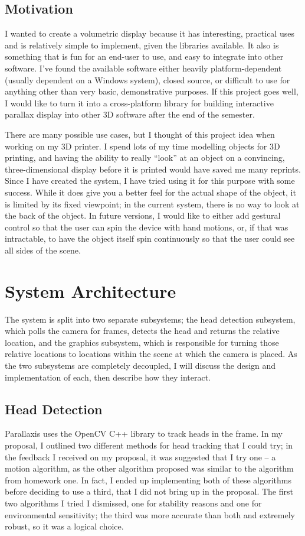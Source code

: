 \subsection{Motivation}
I wanted to create a volumetric display because it has interesting,
practical uses and is relatively simple to implement, given the
libraries available. It also is something that is fun for an end-user
to use, and easy to integrate into other software. I've found the
available software either heavily platform-dependent (usually
dependent on a Windows system), closed source, or difficult to use for
anything other than very basic, demonstrative purposes. If this
project goes well, I would like to turn it into a cross-platform
library for building interactive parallax display into other 3D
software after the end of the semester.

There are many possible use cases, but I thought of this project idea
when working on my 3D printer. I spend lots of my time modelling
objects for 3D printing, and having the ability to really ``look'' at
an object on a convincing, three-dimensional display before it is
printed would have saved me many reprints. Since I have created the
system, I have tried using it for this purpose with some
success. While it does give you a better feel for the actual shape of
the object, it is limited by its fixed viewpoint; in the current
system, there is no way to look at the back of the object. In future
versions, I would like to either add gestural control so that the user
can spin the device with hand motions, or, if that was intractable, to
have the object itself spin continuously so that the user could see
all sides of the scene.

\section{System Architecture}
The system is split into two separate subsystems; the head detection
subsystem, which polls the camera for frames, detects the head and
returns the relative location, and the graphics subsystem, which is
responsible for turning those relative locations to locations within
the scene at which the camera is placed. As the two subsystems are
completely decoupled, I will discuss the design and implementation of
each, then describe how they interact.

\subsection{Head Detection}
Parallaxis uses the OpenCV C++ library to track heads in the frame. In
my proposal, I outlined two different methods for head tracking that I
could try; in the feedback I received on my proposal, it was suggested
that I try one -- a motion algorithm, as the other algorithm proposed
was similar to the algorithm from homework one. In fact, I ended up
implementing both of these algorithms before deciding to use a third,
that I did not bring up in the proposal. The first two algorithms I
tried I dismissed, one for stability reasons and one for environmental
sensitivity; the third was more accurate than both and extremely
robust, so it was a logical choice.

